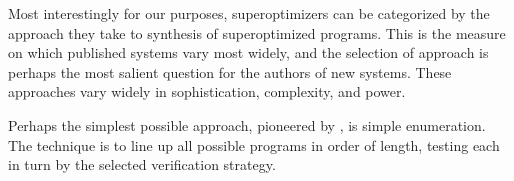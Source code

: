 \documentclass[12pt,twoside]{reedthesis}
\newcommand{\addressed}[2]{{#1}}
\begin{document}
Most interestingly for our purposes, superoptimizers can be categorized by the approach they take to synthesis of superoptimized programs.
This is the measure on which published systems vary most widely, and the selection of approach is
    \addressed{perhaps}{I've noticed this throughout--you can drop a lot of these qualifiers to make it sound more forceful}
    the most salient question for the authors of new systems.
These approaches vary widely in sophistication, complexity, and power.

Perhaps the simplest possible approach, pioneered by \cite{massalin1987superoptimizer}, is simple enumeration. 
The technique is to line up all possible programs in order of length, testing each in turn by the selected verification strategy. 
\end{document}
